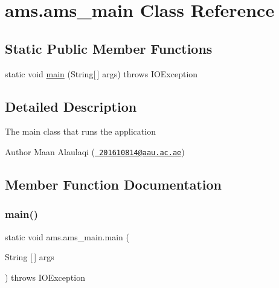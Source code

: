 \hypertarget{classams_1_1ams__main}{}\section{ams.\+ams\+\_\+main Class Reference}
\label{classams_1_1ams__main}
\subsection*{Static Public Member Functions}
\begin{DoxyCompactItemize}
\item 
static void \mbox{\hyperlink{classams_1_1ams__main_a74752faba16c8957221a224d97558e10}{main}} (String\mbox{[}$\,$\mbox{]} args)  throws I\+O\+Exception 
\end{DoxyCompactItemize}


\subsection{Detailed Description}
The main class that runs the application

\begin{DoxyAuthor}{Author}
Maan Alaulaqi (\href{mailto:201610814@aau.ac.ae}{\texttt{ 201610814@aau.\+ac.\+ae}}) 
\end{DoxyAuthor}


\subsection{Member Function Documentation}
\mbox{\label{classams_1_1ams__main_a74752faba16c8957221a224d97558e10}} 
\subsubsection{\texorpdfstring{main()}{main()}}
{\footnotesize\ttfamily static void ams.\+ams\+\_\+main.\+main (\begin{DoxyParamCaption}\item[{String \mbox{[}$\,$\mbox{]}}]{args }\end{DoxyParamCaption}) throws I\+O\+Exception\hspace{0.3cm}{\ttfamily [static]}}

